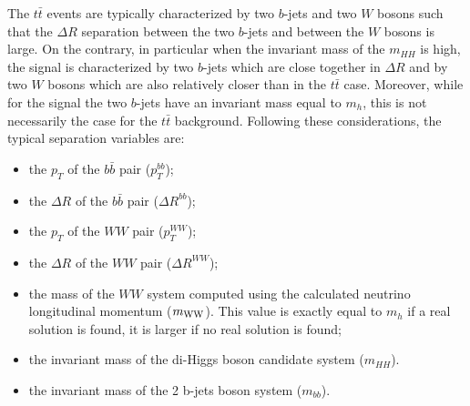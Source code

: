 The $t \bar{t}$ events are typically characterized by two $b$-jets and
two $W$ bosons such that the $\Delta R$ separation between the two
$b$-jets and between the $W$ bosons is large. On the contrary, in particular
when the invariant mass of the $m_{HH}$ is high, the signal is characterized
by two $b$-jets which are close together in $\Delta R$ and by two $W$ bosons
which are also relatively closer than in the $t \bar{t}$
case. Moreover, while for the signal the two $b$-jets have an
invariant mass equal to $m_h$, this is not necessarily the case for the $t \bar{t}$ background.  Following these considerations, the typical separation variables are: 
\begin{itemize}
\item the $p_T$ of the $b \bar{b}$ pair ($p_T^{bb}$);
\item the $\Delta R$ of the $b \bar{b}$ pair ($\Delta R^{bb}$);
\item the $p_T$ of the $WW$ pair ($p_T^{WW}$);
\item the $\Delta R$ of the $WW$ pair ($\Delta R^{WW}$);
\item the mass of the $WW$ system computed using the calculated neutrino
      longitudinal momentum ($m_{\rm WW}$). This value is exactly equal to $m_h$
      if a real solution is found, it is larger if no real solution is found;
\item the invariant mass of the di-Higgs boson candidate system ($m_{HH}$). 
\item the invariant mass of the 2 b-jets boson system ($m_{bb}$). 

\end{itemize}



